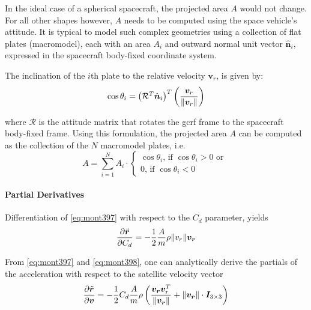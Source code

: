 In the ideal case of a spherical spacecraft, the projected area $A$ 
would not change. For all other shapes however, $A$ needs to be computed using the 
space vehicle's attitude. It is typical to model such complex geometries using a 
collection of flat plates (macromodel), each with an area $A_i$ and outward normal 
unit vector $\hat{\bm{n}}_i$, expressed in the spacecraft body-fixed coordinate system.

The inclination of the $i$th plate to the relative velocity $\bm{v}_r$, is given by:
\begin{equation}\label{markley10110}
  \cos \theta _{i} = \begin{pmatrix}\mathcal{R}^T \hat{\bm{n}}_i \end{pmatrix}^T \left( \frac{\bm{v}_r}{\lVert\bm{v}_r\rVert} \right)
\end{equation}

where $\mathcal{R}$ is the attitude matrix that rotates the \gls{gcrf} frame to the 
spacecraft body-fixed frame. Using this formulation, the projected area $A$ can 
be computed as the collection of the $N$ macromodel plates, i.e.
\begin{equation}
  A = \sum _{i=1}^{N} A_i \cdot 
  \begin{cases} 
    \cos \theta _{i} \text{, if } \cos \theta _{i} > 0 \text{ or }\\
    0 \text{, if } \cos \theta _{i} < 0
  \end{cases}
\end{equation}

\paragraph{Partial Derivatives}\label{par:atmospheric-drag-partials}
Differentiation of \autoref{eq:mont397} with respect to the $C_d$ parameter, yields
\begin{equation}
  \frac{\partial \ddot{\bm{r}}}{\partial C_d} = 
    -\frac{1}{2} \frac{A}{m} \rho \lVert v_r\rVert \bm{v_r}
\end{equation}

From \autoref{eq:mont397} and \autoref{eq:mont398}, one can analytically derive the 
partials of the acceleration with respect to the satellite velocity vector
\begin{equation}
  \frac{\partial \ddot{\bm{r}}}{\partial \bm{v}} = 
  -\frac{1}{2} C_d \frac{A}{m} \rho \left( \frac{\bm{v_r}\bm{v}^T_r}{\lVert\bm{v_r}\rVert} 
    + \lVert\bm{v_r}\rVert \cdot \bm{I}_{3\times 3} \right)
\end{equation}

